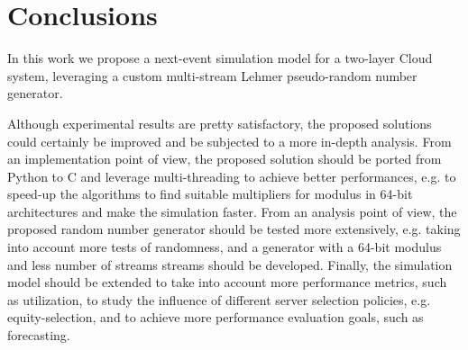 \section{Conclusions}
\label{sec:conclusions}

In this work we propose a next-event simulation model for a two-layer Cloud system, leveraging a custom multi-stream Lehmer pseudo-random number generator.

Although experimental results are pretty satisfactory, the proposed solutions could certainly be improved and be subjected to a more in-depth analysis.
%
From an implementation point of view, the proposed solution should be ported from Python to C and leverage multi-threading to achieve better performances, e.g. to speed-up the algorithms to find suitable multipliers for modulus in 64-bit architectures and make the simulation faster.
%
From an analysis point of view, the proposed random number generator should be tested more extensively, e.g. taking into account more tests of randomness, and a generator with a 64-bit modulus and less number of streams streams should be developed. 
%
Finally, the simulation model should be extended to take into account more performance metrics, such as utilization, to study the influence of different server selection policies, e.g. equity-selection, and to achieve more performance evaluation goals, such as forecasting.
